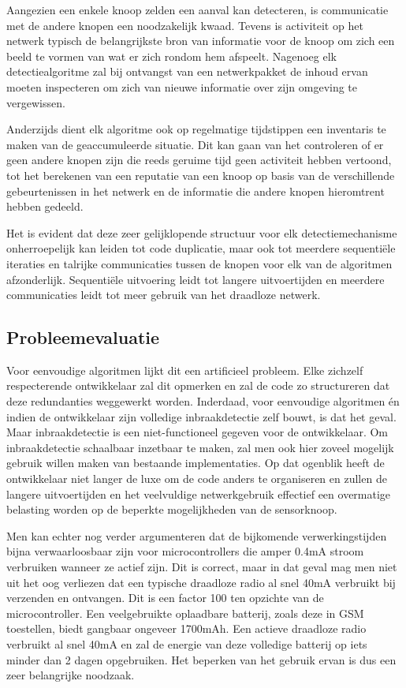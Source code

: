 \documentclass[12pt,a4paper]{article}
\begin{document}
Aangezien een enkele knoop zelden een aanval kan detecteren, is communicatie
met de andere knopen een noodzakelijk kwaad. Tevens is activiteit op het
netwerk typisch de belangrijkste bron van informatie voor de knoop om zich een
beeld te vormen van wat er zich rondom hem afspeelt. Nagenoeg elk
detectiealgoritme zal bij ontvangst van een netwerkpakket de inhoud ervan
moeten inspecteren om zich van nieuwe informatie over zijn omgeving te
vergewissen.

Anderzijds dient elk algoritme ook op regelmatige tijdstippen een inventaris te
maken van de geaccumuleerde situatie. Dit kan gaan van het controleren of er
geen andere knopen zijn die reeds geruime tijd geen activiteit hebben vertoond,
tot het berekenen van een reputatie van een knoop op basis van de verschillende
gebeurtenissen in het netwerk en de informatie die andere knopen hieromtrent
hebben gedeeld.

Het is evident dat deze zeer gelijklopende structuur voor elk
detectiemechanisme onherroepelijk kan leiden tot code duplicatie, maar ook tot
meerdere sequenti\"ele iteraties en talrijke communicaties tussen de knopen
voor elk van de algoritmen afzonderlijk. Sequenti\"ele uitvoering leidt tot
langere uitvoertijden en meerdere communicaties leidt tot meer gebruik van het
draadloze netwerk.

\subsection*{Probleemevaluatie}

Voor eenvoudige algoritmen lijkt dit een artificieel probleem. Elke zichzelf
respecterende ontwikkelaar zal dit opmerken en zal de code zo structureren dat
deze redundanties weggewerkt worden. Inderdaad, voor eenvoudige algoritmen \'en
indien de ontwikkelaar zijn volledige inbraakdetectie zelf bouwt, is dat het
geval. Maar inbraakdetectie is een niet-functioneel gegeven voor de
ontwikkelaar. Om inbraakdetectie schaalbaar inzetbaar te maken, zal men ook
hier zoveel mogelijk gebruik willen maken van bestaande implementaties. Op dat
ogenblik heeft de ontwikkelaar niet langer de luxe om de code anders te
organiseren en zullen de langere uitvoertijden en het veelvuldige
netwerkgebruik effectief een overmatige belasting worden op de beperkte
mogelijkheden van de sensorknoop.

Men kan echter nog verder argumenteren dat de bijkomende verwerkingstijden
bijna verwaarloosbaar zijn voor microcontrollers die amper 0.4mA stroom
verbruiken wanneer ze actief zijn. Dit is correct, maar in dat geval mag men
niet uit het oog verliezen dat een typische draadloze radio al snel 40mA
verbruikt bij verzenden en ontvangen. Dit is een factor 100 ten opzichte van de
microcontroller. Een veelgebruikte oplaadbare batterij, zoals deze in GSM
toestellen, biedt gangbaar ongeveer 1700mAh. Een actieve draadloze radio
verbruikt al snel 40mA en zal de energie van deze volledige batterij op iets
minder dan 2 dagen opgebruiken. Het beperken van het gebruik ervan is dus een
zeer belangrijke noodzaak.
\end{document}
